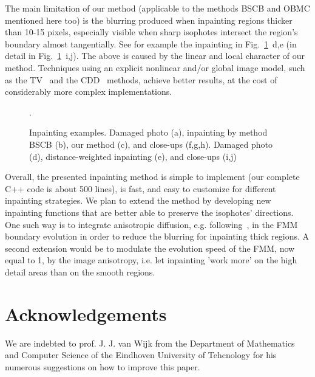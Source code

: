 \documentclass{llncs}
\begin{document}
The main limitation of our method (applicable to the methods BSCB and
OBMC mentioned here too) is the blurring produced when inpainting
regions thicker than 10-15 pixels, especially visible when sharp isophotes
intersect the region's boundary almost tangentially. See for example the
inpainting in Fig.~\ref{fig:example2}~d,e (in
detail in Fig.~\ref{fig:example2}~i,j). The above is caused by the linear
and local character of our method. Techniques using an explicit nonlinear
and/or global image model, such as the TV~\cite{chan} and the CDD~\cite{chan2} methods,
achieve better results, at the cost of considerably more complex implementations.
%
	\begin{figure}[h] \centering
	\caption{Inpainting examples. Damaged photo (a), inpainting by method BSCB (b), 
         our method (c), and close-ups (f,g,h).
         Damaged photo (d), distance-weighted inpainting (e), and close-ups (i,j)}.
	\label{fig:example2} 
        \end{figure} 

Overall, the presented inpainting method is simple to implement (our complete C++ code is 
about 500 lines), is fast, and easy to customize for different inpainting strategies.
We plan to extend the method by developing new inpainting functions that
are better able to preserve the isophotes' directions. One such way is to
integrate anisotropic diffusion, e.g. following~\cite{bertalmio1}, in the FMM boundary
evolution in order to reduce the blurring for inpainting thick regions. A
second extension would be to modulate the evolution speed of the FMM, now
equal to 1, by the image anisotropy, i.e. let inpainting 'work more' on the
high detail areas than on the smooth regions.
%
%
\section*{Acknowledgements}
%
  We are indebted to prof. J. J. van Wijk from the Department of
Mathematics and Computer Science of the Eindhoven University of Tehcnology
for his numerous suggestions on how to improve this paper.
%
\end{document}
